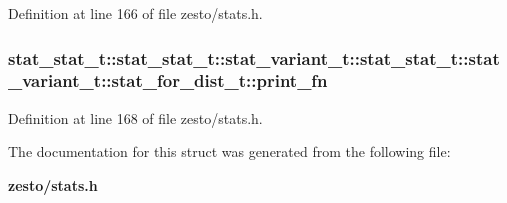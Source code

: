 Definition at line 166 of file zesto/stats.h.
\subsubsection[{print\_\-fn}]{ stat\_\-stat\_\-t::stat\_\-stat\_\-t::stat\_\-variant\_\-t::stat\_\-stat\_\-t::stat\_\-variant\_\-t::stat\_\-for\_\-dist\_\-t::print\_\-fn}\label{structstat__stat__t_1_1stat__variant__t_1_1stat__for__dist__t_062cd5eeb48233dff42f18209915866d}




Definition at line 168 of file zesto/stats.h.

The documentation for this struct was generated from the following file:\begin{CompactItemize}
\item 
{\bf zesto/stats.h}\end{CompactItemize}
